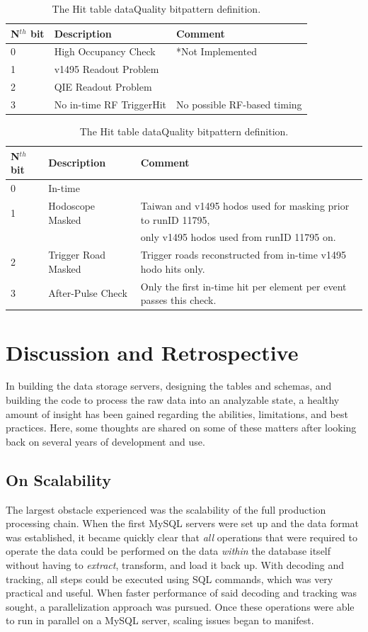 \begin{table}
	\centering
	\caption{The Event table dataQuality bitpattern definition.}
	\label{tab:event-dq}
	\begin{tabular}{lll} \toprule
		N$^{th}$ bit & Description & Comment \\ \midrule
		0 & High Occupancy Check & *Not Implemented \\
		1 & v1495 Readout Problem &  \\
		2 & QIE Readout Problem & \\
		3 & No in-time RF TriggerHit & No possible RF-based timing \\ \bottomrule
	\end{tabular}
	\vspace{1cm}
	\caption{The Hit table dataQuality bitpattern definition.}
	\label{tab:hit-dq}
	\begin{tabular}{lll} \toprule
		N$^{th}$ bit & Description & Comment \\ \midrule
		0 & In-time & \\
		1 & Hodoscope Masked & Taiwan and v1495 hodos used for masking prior to runID 11795, \\ & & only v1495 hodos used from runID 11795 on. \\
		2 & Trigger Road Masked & Trigger roads reconstructed from in-time v1495 hodo hits only. \\
		3 & After-Pulse Check & Only the first in-time hit per element per event passes this check. \\ \bottomrule
	\end{tabular}
\end{table}

\section{Discussion and Retrospective}

In building the data storage servers, designing the tables and schemas, and building the code to process the raw data into an analyzable state, a healthy amount of insight has been gained regarding the abilities, limitations, and best practices. Here, some thoughts are shared on some of these matters after looking back on several years of development and use.

\subsection{On Scalability}

The largest obstacle experienced was the scalability of the full production processing chain. When the first MySQL servers were set up and the data format was established, it became quickly clear that \emph{all} operations that were required to operate the data could be performed on the data \emph{within} the database itself without having to \emph{extract}, transform, and load it back up. With decoding and tracking, all steps could be executed using SQL commands, which was very practical and useful. When faster performance of said decoding and tracking was sought, a parallelization approach was pursued. Once these operations were able to run in parallel on a MySQL server, scaling issues began to manifest.

